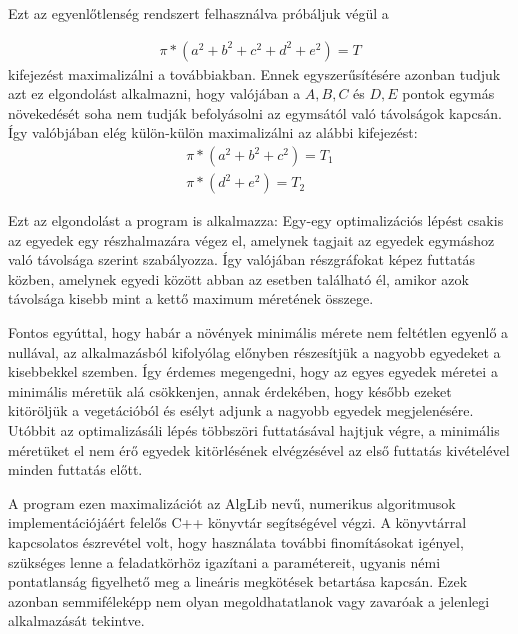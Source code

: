 Ezt az egyenlőtlenség rendszert felhasználva próbáljuk végül a

\begin{align}
	\pi * (a^2 + b^2 + c^2 + d^2 + e^2) = T
\end{align}
kifejezést maximalizálni a továbbiakban. 
Ennek egyszerűsítésére azonban tudjuk azt ez elgondolást alkalmazni, hogy valójában a $A,B,C$ és $D,E$ pontok egymás növekedését soha nem tudják befolyásolni az egymsától való távolságok kapcsán. Így valóbjában elég külön-külön maximalizálni az alábbi kifejezést:
\begin{align}
  \pi * (a^2 + b^2 + c^2) = T_1 \\
  \pi * (d^2 + e^2) = T_2
\end{align}

Ezt az elgondolást a program is alkalmazza: Egy-egy optimalizációs lépést csakis az egyedek egy részhalmazára végez el, amelynek tagjait az egyedek egymáshoz való távolsága szerint szabályozza. Így valójában részgráfokat képez futtatás közben, amelynek egyedi között abban az esetben található él, amikor azok távolsága kisebb mint a kettő maximum méretének összege.

Fontos egyúttal, hogy habár a növények minimális mérete nem feltétlen egyenlő a nullával, az alkalmazásból kifolyólag előnyben részesítjük a nagyobb egyedeket a kisebbekkel szemben. Így érdemes megengedni, hogy az egyes egyedek méretei a minimális méretük alá csökkenjen, annak érdekében, hogy később ezeket kitöröljük a vegetációból és esélyt adjunk a nagyobb egyedek megjelenésére. Utóbbit az optimalizásáli lépés többszöri futtatásával hajtjuk végre, a minimális méretüket el nem érő egyedek kitörlésének elvégzésével az első futtatás kivételével minden futtatás előtt. 

A program ezen maximalizációt az AlgLib nevű, numerikus algoritmusok implementációjáért felelős C++ könyvtár segítségével végzi. A könyvtárral kapcsolatos észrevétel volt, hogy használata további finomításokat igényel, szükséges lenne a feladatkörhöz igazítani a paramétereit, ugyanis némi pontatlanság figyelhető meg a lineáris megkötések betartása kapcsán. Ezek azonban semmiféleképp nem olyan megoldhatatlanok vagy zavaróak a jelenlegi alkalmazását tekintve. 



